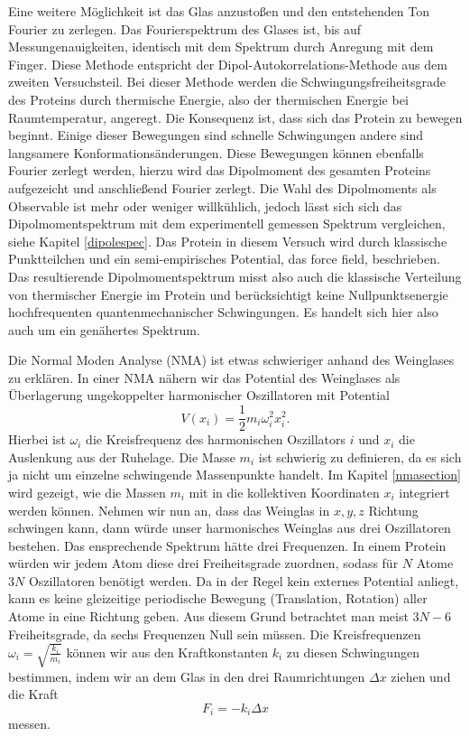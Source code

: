 \documentclass[a4paper,12pt]{article}
\begin{document}
Eine weitere Möglichkeit ist das Glas anzustoßen und den entstehenden Ton Fourier zu zerlegen. Das Fourierspektrum des Glases ist, bis auf 
Messungenauigkeiten, identisch mit dem Spektrum durch Anregung mit dem Finger. Diese Methode entspricht der Dipol-Autokorrelations-Methode aus 
dem zweiten Versuchsteil. Bei dieser Methode werden die Schwingungsfreiheitsgrade des Proteins durch thermische Energie, also der thermischen 
Energie bei Raumtemperatur, angeregt. Die Konsequenz ist, dass sich das Protein zu bewegen beginnt. Einige dieser Bewegungen sind schnelle Schwingungen 
andere sind langsamere Konformationsänderungen. Diese Bewegungen können ebenfalls Fourier zerlegt werden, hierzu wird das Dipolmoment des gesamten Proteins 
aufgezeicht und anschließend Fourier zerlegt. Die Wahl des Dipolmoments als Observable ist mehr oder weniger willkühlich, jedoch lässt sich sich 
das Dipolmomentspektrum mit dem experimentell gemessen Spektrum vergleichen, siehe Kapitel \ref{dipolespec}. Das Protein in diesem Versuch 
wird durch klassische Punktteilchen und ein semi-empirisches Potential, das force field, beschrieben. Das resultierende Dipolmomentspektrum misst also
auch die klassische Verteilung von thermischer Energie im Protein und berücksichtigt keine Nullpunktsenergie hochfrequenten quantenmechanischer 
Schwingungen. Es handelt sich hier also auch um ein genähertes Spektrum.


Die Normal Moden Analyse (NMA) ist etwas schwieriger anhand des Weinglases zu erklären. In einer NMA nähern wir das Potential des Weinglases als Überlagerung
ungekoppelter harmonischer Oszillatoren mit Potential
\begin{equation}
 V(x_i)=\frac{1}{2} m_i \omega_i^2 x_i^2.
\end{equation}
Hierbei ist $\omega_i$ die Kreisfrequenz des harmonischen Oszillators $i$ und $x_i$ die Auslenkung aus der Ruhelage. Die Masse $m_i$ ist schwierig zu definieren, 
da es sich ja nicht um einzelne schwingende Massenpunkte handelt. Im Kapitel \ref{nmasection} wird gezeigt, wie die Massen $m_i$ mit in die kollektiven Koordinaten
$x_i$ integriert werden können.
Nehmen wir nun an, dass das Weinglas in $x,y,z$ Richtung schwingen kann, dann würde unser harmonisches Weinglas aus drei Oszillatoren bestehen. Das ensprechende 
Spektrum hätte drei Frequenzen. In einem Protein würden wir jedem Atom diese drei Freiheitsgrade zuordnen, sodass für $N$ Atome $3N$ Oszillatoren benötigt werden.
Da in der Regel kein externes Potential anliegt, kann es keine gleizeitige periodische Bewegung (Translation, Rotation) aller Atome in eine Richtung geben.
Aus diesem Grund betrachtet man meist $3N-6$ Freiheitsgrade, da sechs Frequenzen Null sein müssen. 
Die Kreisfrequenzen $\omega_i=\sqrt{\frac{k_i}{m_i}}$ können wir aus den Kraftkonstanten $k_i$ 
zu diesen Schwingungen bestimmen, indem wir an dem Glas in den drei Raumrichtungen $\Delta x$ ziehen und die Kraft 
\begin{equation}
 F_i=-k_i \Delta x
\end{equation}
messen. 
\end{document}
